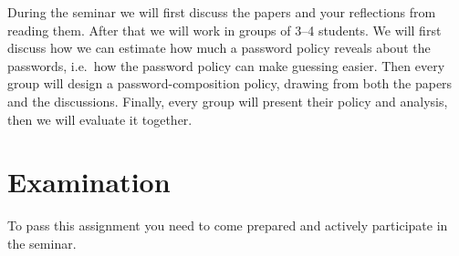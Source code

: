 During the seminar we will first discuss the papers and your reflections from 
reading them.
After that we will work in groups of 3--4 students.
We will first discuss how we can estimate how much a password policy reveals 
about the passwords, i.e.\ how the password policy can make guessing easier.
Then every group will design a password-composition policy, drawing from both 
the papers and the discussions.
Finally, every group will present their policy and analysis, then we will 
evaluate it together.


\section{Examination}
\label{sec:exam}

To pass this assignment you need to come prepared and actively participate in 
the seminar.


\subsubsection*{\ackname}




\printbibliography{}
